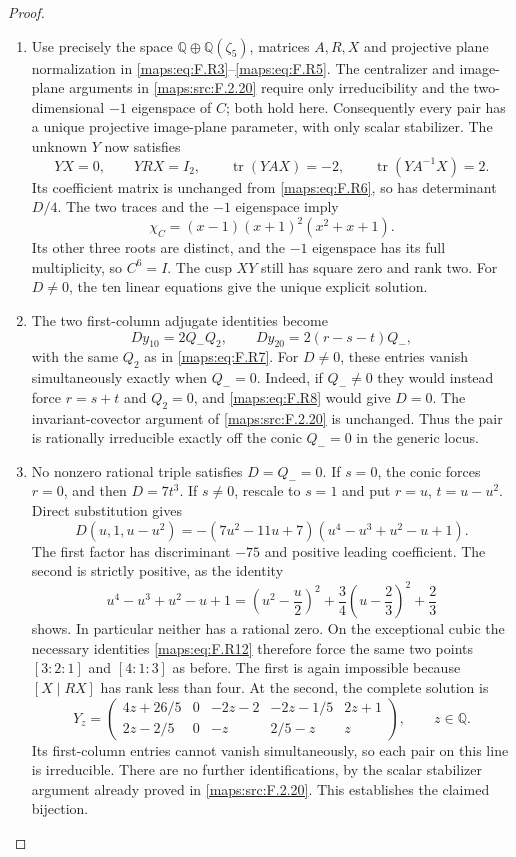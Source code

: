 \begin{proof}
\begin{enumerate}[label=\arabic*.]
\item Use precisely the space $\mathbb Q\oplus\mathbb Q(\zeta_5)$,
matrices $A,R,X$ and projective plane normalization in
\eqref{maps:eq:F.R3}--\eqref{maps:eq:F.R5}.  The centralizer and image-plane arguments
in \ref{maps:src:F.2.20} require only irreducibility and the two-dimensional
$-1$ eigenspace of $C$; both hold here.
Consequently every pair has a unique projective image-plane
parameter, with only scalar stabilizer.
The unknown $Y$ now satisfies
\[
 YX=0,\qquad YRX=I_2,\qquad
 \operatorname{tr}(YAX)=-2,\qquad
 \operatorname{tr}(YA^{-1}X)=2.
 \tag{F.R11}\label{maps:eq:F.R11}
\]
Its coefficient matrix is unchanged from \eqref{maps:eq:F.R6}, so has
determinant $D/4$.
The two traces and the $-1$ eigenspace imply
\[
 \chi_C=(x-1)(x+1)^2(x^2+x+1).
\]
Its other three roots are distinct, and the $-1$ eigenspace
has its full multiplicity, so $C^6=I$.
The cusp $XY$ still has square zero and rank two.
For $D\ne0$, the ten linear equations give the unique
explicit solution.

\item The two first-column adjugate identities become
\[
 D y_{10}=2Q_-Q_2,
 \qquad D y_{20}=2(r-s-t)Q_-,
 \tag{F.R12}\label{maps:eq:F.R12}
\]
with the same $Q_2$ as in \eqref{maps:eq:F.R7}.
For $D\ne0$, these entries vanish simultaneously exactly
when $Q_-=0$.
Indeed, if $Q_-\ne0$ they would instead force
$r=s+t$ and $Q_2=0$, and \eqref{maps:eq:F.R8} would give $D=0$.
The invariant-covector argument of \ref{maps:src:F.2.20} is unchanged.
Thus the pair is rationally irreducible exactly off the
conic $Q_-=0$ in the generic locus.

\item No nonzero rational triple satisfies $D=Q_-=0$.
If $s=0$, the conic forces $r=0$, and then $D=7t^3$.
If $s\ne0$, rescale to $s=1$ and put
$r=u$, $t=u-u^2$.  Direct substitution gives
\[
 D(u,1,u-u^2)=
 -(7u^2-11u+7)(u^4-u^3+u^2-u+1).
 \tag{F.R13}\label{maps:eq:F.R13}
\]
The first factor has discriminant $-75$ and positive
leading coefficient.  The second is strictly positive,
as the identity
\[
 u^4-u^3+u^2-u+1
 =\left(u^2-\frac u2\right)^2
  +\frac34\left(u-\frac23\right)^2+\frac23
\]
shows.  In particular neither has a rational zero.
On the exceptional cubic the necessary identities \eqref{maps:eq:F.R12}
therefore force the same two points $[3:2:1]$ and $[4:1:3]$
as before.  The first is again impossible because
$[X\mid RX]$ has rank less than four.
At the second, the complete solution is
\[
 Y_z=\begin{pmatrix}
 4z+26/5&0&-2z-2&-2z-1/5&2z+1\\
 2z-2/5&0&-z&2/5-z&z
 \end{pmatrix},\qquad z\in\mathbb Q.
 \tag{F.R14}\label{maps:eq:F.R14}
\]
Its first-column entries cannot vanish simultaneously,
so each pair on this line is irreducible.
There are no further identifications, by the scalar
stabilizer argument already proved in \ref{maps:src:F.2.20}.
This establishes the claimed bijection.


\end{enumerate}
\end{proof}
